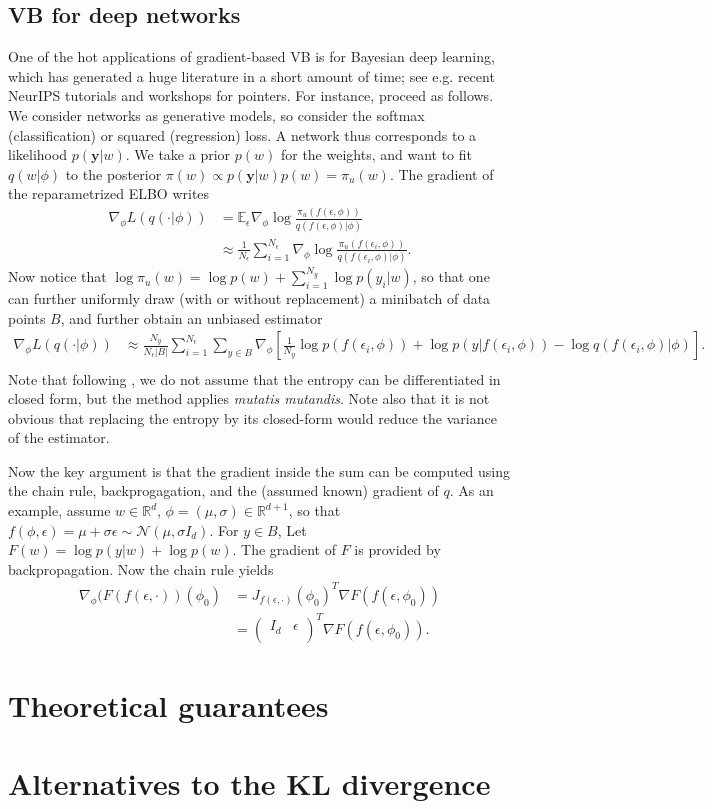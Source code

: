 \subsection{VB for deep networks}
One of the hot applications of gradient-based VB is for Bayesian deep learning, which has generated a huge literature in a short amount of time; see e.g. recent NeurIPS tutorials and workshops for pointers.  
For instance, \cite{BCKW15} proceed as follows.
We consider networks as generative models, so consider the softmax (classification) or squared (regression) loss.
A network thus corresponds to a likelihood $p(\mathbf{y}\vert w)$.
We take a prior $p(w)$ for the weights, and want to fit $q(w\vert\phi)$ to the posterior $\pi(w) \propto p(\mathbf{y}\vert w)p(w) = \pi_u(w)$.
The gradient of the reparametrized ELBO writes
\begin{align*}
\nabla_\phi L(q(\cdot\vert\phi)) &= \mathbb E_\epsilon \nabla_\phi \log \frac{\pi_u(f(\epsilon,\phi))}{q(f(\epsilon,\phi)\vert\phi)}\\
&\approx \frac{1}{N_\epsilon} \sum_{i=1}^{N_\epsilon} \nabla_\phi \log \frac{\pi_u(f(\epsilon_i,\phi))}{q(f(\epsilon_i,\phi)\vert\phi)}.
\end{align*}
Now notice that $\log\pi_u(w) = \log p(w) + \sum_{i=1}^{N_y} \log p(y_i\vert w)$, so that one can further uniformly draw (with or without replacement) a minibatch of data points $B$, and further obtain an unbiased estimator 
\begin{align*}
\nabla_\phi L(q(\cdot\vert\phi)) &\approx \frac{N_y}{N_\epsilon \vert B\vert} \sum_{i=1}^{N_\epsilon} \sum_{y\in B} \nabla_\phi \left [ \frac{1}{N_y}\log p(f(\epsilon_i,\phi)) + \log p(y\vert f(\epsilon_i,\phi)) - \log q(f(\epsilon_i,\phi)\vert\phi) \right ].\\
\end{align*}
Note that following \cite{BCKW15}, we do not assume that the entropy can be differentiated in closed form, but the method applies \emph{mutatis mutandis}. 
Note also that it is not obvious that replacing the entropy by its closed-form would reduce the variance of the estimator.

Now the key argument is that the gradient inside the sum can be computed using the chain rule, backprogagation, and the (assumed known) gradient of $q$.
As an example, assume $w\in\mathbb{R}^d$, $\phi=(\mu,\sigma)\in\mathbb{R}^{d+1}$, so that $f(\phi,\epsilon) = \mu + \sigma \epsilon \sim \mathcal{N}(\mu, \sigma I_d)$. 
For $y\in B$, Let $F(w) = \log p(y\vert w) + \log p(w)$. 
The gradient of $F$ is provided by backpropagation. 
Now the chain rule yields
\begin{align*}
  \nabla_\phi (F(f(\epsilon, \cdot))(\phi_0) &= J_{f(\epsilon,\cdot)}(\phi_0)^T \nabla F (f(\epsilon, \phi_0))\\
  &= \begin{pmatrix} I_d & \epsilon \\\end{pmatrix}^T \nabla F (f(\epsilon, \phi_0)).
\end{align*}

\section{Theoretical guarantees}

\section{Alternatives to the KL divergence}

